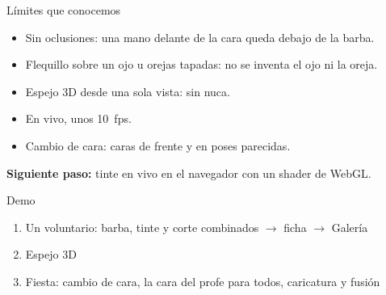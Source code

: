 \documentclass[aspectratio=169,11pt]{beamer}
\begin{document}
\begin{frame}{Límites que conocemos}
  \large
  \begin{itemize}
    \item Sin oclusiones: una mano delante de la cara queda debajo de la barba.
    \item Flequillo sobre un ojo u orejas tapadas: no se inventa el ojo ni la oreja.
    \item Espejo 3D desde una sola vista: sin nuca.
    \item En vivo, unos 10~fps.
    \item Cambio de cara: caras de frente y en poses parecidas.
  \end{itemize}
  \vspace{0.8em}
  \textbf{Siguiente paso:} tinte en vivo en el navegador con un shader de WebGL.
\end{frame}

\begin{frame}[plain]
  \vfill
  {Demo}
  \vspace{1em}

  \Large
  \begin{enumerate}
    \item Un voluntario: barba, tinte y corte combinados $\rightarrow$ ficha $\rightarrow$ Galería
    \item Espejo 3D
    \item Fiesta: cambio de cara, la cara del profe para todos, caricatura y fusión
  \end{enumerate}
  \vfill
\end{frame}
\end{document}
